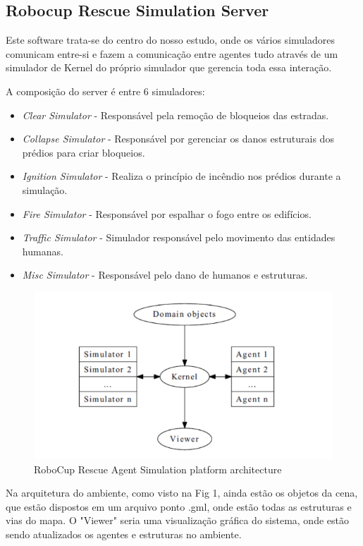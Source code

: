 \documentclass[conference]{IEEEtran}
\begin{document}
\subsection{Robocup Rescue Simulation Server}

Este software trata-se do centro do nosso estudo, onde os vários simuladores comunicam entre-si e fazem a comunicação entre agentes tudo através de um simulador de Kernel do próprio simulador que gerencia toda essa interação.

A composição do server é entre 6 simuladores:
\begin{itemize}
\item \textit {Clear Simulator} - Responsável pela remoção de bloqueios das estradas. 
\item \textit {Collapse Simulator} - Responsável por gerenciar os danos estruturais dos prédios para criar bloqueios.
\item \textit {Ignition Simulator} - Realiza o princípio de incêndio nos prédios durante a simulação.
\item \textit {Fire Simulator} - Responsável por espalhar o fogo entre os edifícios.
\item \textit {Traffic Simulator} - Simulador responsável pelo movimento das entidades humanas.
\item \textit {Misc Simulator} - Responsável pelo dano de humanos e estruturas.
\end{itemize}

\begin{figure}[htbp]
\centerline{\includegraphics[scale=0.3]{fig1.png}}
\caption{RoboCup Rescue Agent Simulation platform architecture \cite{b1}}
\label{fig}
\end{figure}

Na arquitetura do ambiente, como visto na Fig 1, ainda estão os objetos da cena, que estão dispostos em um arquivo ponto .gml, onde estão todas as estruturas e vias do mapa. O "Viewer" seria uma visualização gráfica do sistema, onde estão sendo atualizados os agentes e estruturas no ambiente. 
\end{document}
